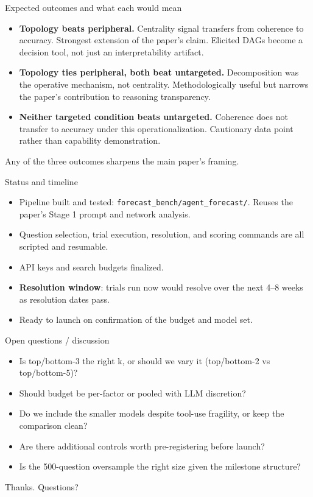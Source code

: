 \documentclass[aspectratio=169]{beamer}
\begin{document}
\begin{frame}{Expected outcomes and what each would mean}
\begin{itemize}
  \item \textbf{Topology beats peripheral.} Centrality signal transfers from coherence to accuracy. Strongest extension of the paper's claim. Elicited DAGs become a decision tool, not just an interpretability artifact.
  \item \textbf{Topology ties peripheral, both beat untargeted.} Decomposition was the operative mechanism, not centrality. Methodologically useful but narrows the paper's contribution to reasoning transparency.
  \item \textbf{Neither targeted condition beats untargeted.} Coherence does not transfer to accuracy under this operationalization. Cautionary data point rather than capability demonstration.
\end{itemize}

\vspace{0.5em}
Any of the three outcomes sharpens the main paper's framing.
\end{frame}

\begin{frame}{Status and timeline}
\begin{itemize}
  \item Pipeline built and tested: \texttt{forecast\_bench/agent\_forecast/}. Reuses the paper's Stage 1 prompt and network analysis.
  \item Question selection, trial execution, resolution, and scoring commands are all scripted and resumable.
  \item API keys and search budgets finalized.
  \item \textbf{Resolution window}: trials run now would resolve over the next 4--8 weeks as resolution dates pass.
  \item Ready to launch on confirmation of the budget and model set.
\end{itemize}
\end{frame}

\begin{frame}{Open questions / discussion}
\begin{itemize}
  \item Is top/bottom-3 the right k, or should we vary it (top/bottom-2 vs top/bottom-5)?
  \item Should budget be per-factor or pooled with LLM discretion?
  \item Do we include the smaller models despite tool-use fragility, or keep the comparison clean?
  \item Are there additional controls worth pre-registering before launch?
  \item Is the 500-question oversample the right size given the milestone structure?
\end{itemize}
\end{frame}

\begin{frame}[standout]
Thanks. Questions?
\end{frame}
\end{document}
